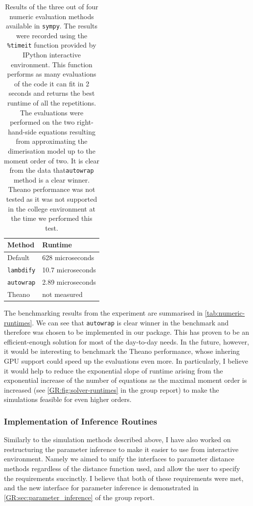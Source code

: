 \begin{table}
    \centering
    \begin{tabular}{l|l}
    Method & Runtime \\
    \hline
    Default & 628 microseconds \\
    \verb"lambdify" & 10.7 microseconds \\
    \verb"autowrap" & 2.89 microseconds \\
    Theano & not measured \\
    \end{tabular}
    \caption{Results of the three out of four numeric evaluation methods available in {\tt sympy}. 
    The results were recorded using the {\tt \%timeit} 
    function provided by IPython\cite{perez_ipython:_2007} interactive environment. 
    This function performs as many evaluations of the code it can fit in 2 seconds and returns the best runtime of all the repetitions.
    The evaluations were performed on the two right-hand-side equations resulting from approximating the dimerisation model up to the moment order of two.
    It is clear from the data that{\tt autowrap} method is a clear winner. 
    Theano performance was not tested as it was not supported in the college environment at the time we performed this test.}
    \label{tab:numeric-runtimes}
\end{table}

The benchmarking results from the experiment are summarised in \autoref{tab:numeric-runtimes}. 
We can see that \verb"autowrap" is clear winner in the benchmark and therefore was chosen to be implemented in our package.
This has proven to be an efficient-enough solution for most of the day-to-day needs. 
In the future, however, it would be interesting to benchmark the Theano performance, whose inhering GPU support could speed up the evaluations even more.
In particularly, I believe it would help to reduce the exponential slope of runtime arising from the exponential increase of the number of equations as the maximal moment order is increased (see \autoref{GR:fig:solver-runtimes} in the group report) to make the simulations feasible for even higher orders. 

\subsubsection{Implementation of Inference Routines}

Similarly to the simulation methods described above, I have also worked on restructuring the parameter inference to make it easier to use from interactive environment. 
Namely we aimed to unify the interfaces to parameter distance methods regardless of the distance function used, and allow the user to specify the requirements succinctly.
I believe that both of these requirements were met, and the new interface for parameter inference is demonstrated in \autoref*{GR:sec:parameter_inference} of the group report.

